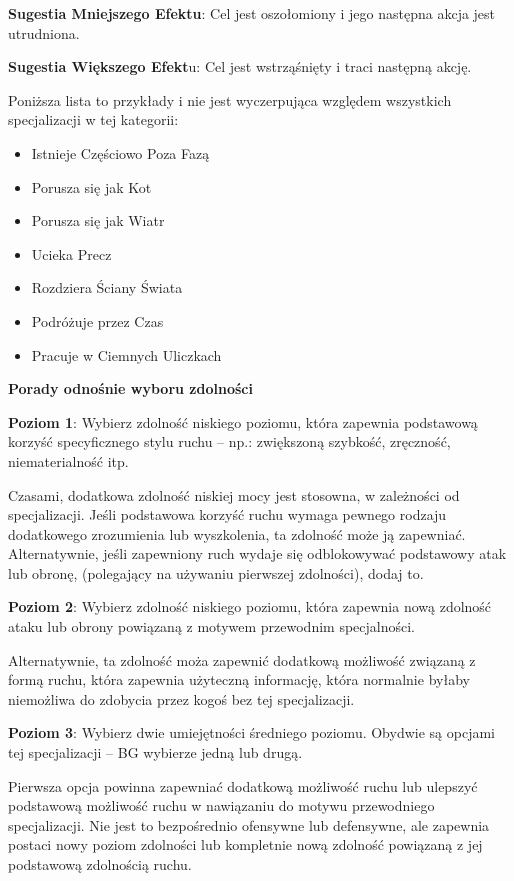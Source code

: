 \textbf{Sugestia Mniejszego Efektu}: Cel jest oszołomiony i jego następna akcja jest utrudniona.

\textbf{Sugestia Większego Efekt}u: Cel jest wstrząśnięty i traci następną akcję.

Poniższa lista to przykłady i nie jest wyczerpująca względem wszystkich specjalizacji w tej kategorii:

\begin{itemize}
\item Istnieje Częściowo Poza Fazą
\item Porusza się jak Kot
\item Porusza się jak Wiatr
\item Ucieka Precz
\item Rozdziera Ściany Świata
\item Podróżuje przez Czas
\item Pracuje w Ciemnych Uliczkach
\end{itemize}

\textbf{Porady odnośnie wyboru zdolności}

\textbf{Poziom 1}: Wybierz zdolność niskiego poziomu, która zapewnia podstawową korzyść specyficznego stylu ruchu – np.: zwiększoną szybkość, zręczność, niematerialność itp.

Czasami, dodatkowa zdolność niskiej mocy jest stosowna, w zależności od specjalizacji. Jeśli podstawowa korzyść ruchu wymaga pewnego rodzaju dodatkowego zrozumienia lub wyszkolenia, ta zdolność może ją zapewniać. Alternatywnie, jeśli zapewniony ruch wydaje się odblokowywać podstawowy atak lub obronę, (polegający na używaniu pierwszej zdolności), dodaj to.

\textbf{Poziom 2}: Wybierz zdolność niskiego poziomu, która zapewnia nową zdolność ataku lub obrony powiązaną z motywem przewodnim specjalności. 

Alternatywnie, ta zdolność moża zapewnić dodatkową możliwość związaną z formą ruchu, która zapewnia użyteczną informację, która normalnie byłaby niemożliwa do zdobycia przez kogoś bez tej specjalizacji. 

\textbf{Poziom 3}: Wybierz dwie umiejętności średniego poziomu. Obydwie są opcjami tej specjalizacji – BG wybierze jedną lub drugą.

Pierwsza opcja powinna zapewniać dodatkową możliwość ruchu lub ulepszyć podstawową możliwość ruchu w nawiązaniu do motywu przewodniego specjalizacji. Nie jest to bezpośrednio ofensywne lub defensywne, ale zapewnia postaci nowy poziom zdolności lub kompletnie nową zdolność powiązaną z jej podstawową zdolnością ruchu.

